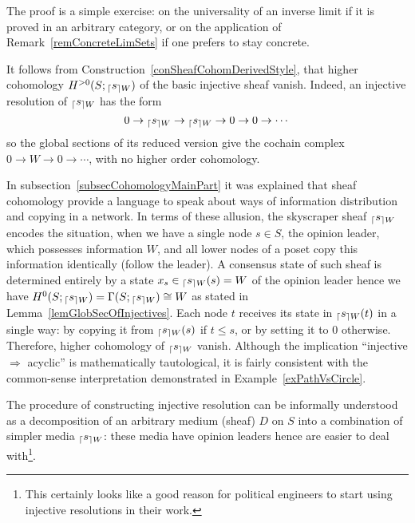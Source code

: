 The proof is a simple exercise: on the universality of an inverse limit if it is proved in an arbitrary category, or on the application of Remark~\ref{remConcreteLimSets} if one prefers to stay concrete.

\begin{rem}\label{remOpinionLeader}
It follows from Construction~\ref{conSheafCohomDerivedStyle}, that higher cohomology $H^{>0}(S;{_{\lceil}s_{\rceil W}})$ of the basic injective sheaf vanish. Indeed, an injective resolution of ${_{\lceil}s_{\rceil W}}$ has the form
\[
0\to {_{\lceil}s_{\rceil W}}\to {_{\lceil}s_{\rceil W}}\to 0\to 0\to\cdots
\]
so the global sections of its reduced version give the cochain complex $0\to W\to 0\to\cdots$, with no higher order cohomology.

In subsection~\ref{subsecCohomologyMainPart} it was explained that sheaf cohomology provide a language to speak about ways of information distribution and copying in a network. In terms of these allusion, the skyscraper sheaf ${_{\lceil}s_{\rceil W}}$ encodes the situation, when we have a single node $s\in S$, the opinion leader, which possesses information $W$, and all lower nodes of a poset copy this information identically (follow the leader). A consensus state of such sheaf is determined entirely by a state $x_s\in {_{\lceil}s_{\rceil W}}(s)=W$ of the opinion leader hence we have $H^0(S;{_{\lceil}s_{\rceil W}})=\Gamma(S;{_{\lceil}s_{\rceil W}})\cong W$ as stated in Lemma~\ref{lemGlobSecOfInjectives}. Each node $t$ receives its state in ${_{\lceil}s_{\rceil W}}(t)$ in a single way: by copying it from ${_{\lceil}s_{\rceil W}}(s)$ if $t\leq s$, or by setting it to $0$ otherwise. Therefore, higher cohomology of ${_{\lceil}s_{\rceil W}}$ vanish. Although the implication ``injective $\Rightarrow$ acyclic'' is mathematically tautological, it is fairly consistent with the common-sense interpretation demonstrated in Example~\ref{exPathVsCircle}.

The procedure of constructing injective resolution can be informally understood as a decomposition of an arbitrary medium (sheaf) $D$ on $S$ into a combination of simpler media ${_{\lceil}s_{\rceil W}}$: these media have opinion leaders hence are easier to deal with\footnote{This certainly looks like a good reason for political engineers to start using injective resolutions in their work.}.
\end{rem}

